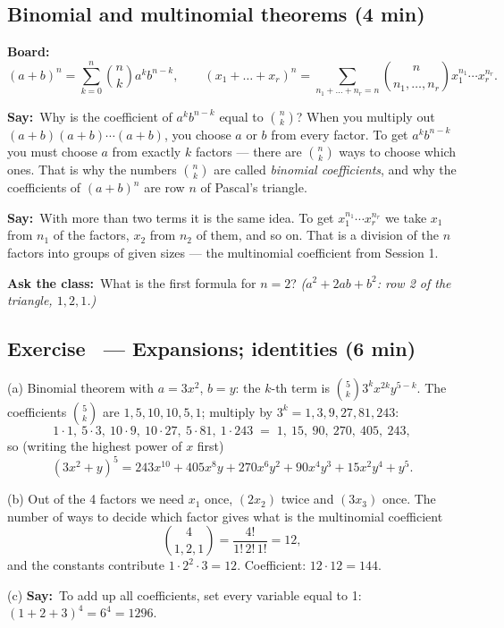 \documentclass[11pt,a4paper,parskip=half]{scrartcl}
\newcommand{\say}{\textbf{\color{teal}Say:}\ }
\newcommand{\board}{\textbf{\color{gold}Board:}\ }
\newcommand{\ask}{\textbf{\color{navy}Ask the class:}\ }
\newcommand{\slide}[1]{\marginpar{\raggedright\footnotesize\color{gray}slide #1}}
\begin{document}
\subsection{Binomial and multinomial theorems (4 min)}\slide{22}

\board
\[ (a+b)^n = \sum_{k=0}^{n}\binom nk a^kb^{n-k},\qquad
	(x_1+\dots+x_r)^n = \sum_{n_1+\dots+n_r=n}\binom{n}{n_1,\dots,n_r}
	x_1^{n_1}\cdots x_r^{n_r}. \]

\say Why is the coefficient of $a^kb^{n-k}$ equal to $\binom nk$? When you
multiply out $(a+b)(a+b)\cdots(a+b)$, you choose $a$ or $b$ from every
factor. To get $a^kb^{n-k}$ you must choose $a$ from exactly $k$ factors ---
there are $\binom nk$ ways to choose which ones. That is why the numbers
$\binom nk$ are called \emph{binomial coefficients}, and why the
coefficients of $(a+b)^n$ are row $n$ of Pascal's triangle.

\say With more than two terms it is the same idea. To get
$x_1^{n_1}\cdots x_r^{n_r}$ we take $x_1$ from $n_1$ of the factors, $x_2$
from $n_2$ of them, and so on. That is a division of the $n$ factors into
groups of given sizes --- the multinomial coefficient from Session 1.

\ask What is the first formula for $n=2$? \emph{($a^2+2ab+b^2$: row 2 of the
	triangle, $1,2,1$.)}

\subsection{Exercise~ --- Expansions; identities (6 min)}\slide{23}


(a) Binomial theorem with $a = 3x^2$, $b = y$: the $k$-th term is
$\binom5k 3^kx^{2k}y^{5-k}$. The coefficients $\binom5k$ are
$1,5,10,10,5,1$; multiply by $3^k = 1,3,9,27,81,243$:
\[ 1\cdot1,\ 5\cdot3,\ 10\cdot9,\ 10\cdot27,\ 5\cdot81,\ 1\cdot243
	\;=\; 1,\ 15,\ 90,\ 270,\ 405,\ 243, \]
so (writing the highest power of $x$ first)
\[ (3x^2+y)^5 = 243x^{10} + 405x^8y + 270x^6y^2 + 90x^4y^3 + 15x^2y^4 + y^5. \]

(b) Out of the 4 factors we need $x_1$ once, $(2x_2)$ twice and $(3x_3)$
once. The number of ways to decide which factor gives what is the
multinomial coefficient
\[ \binom{4}{1,2,1} = \frac{4!}{1!\,2!\,1!} = 12, \]
and the constants contribute $1\cdot2^2\cdot3 = 12$. Coefficient:
$12\cdot12 = 144$.

(c) \say To add up all coefficients, set every variable equal to 1:
$(1+2+3)^4 = 6^4 = 1296$.
\end{document}
